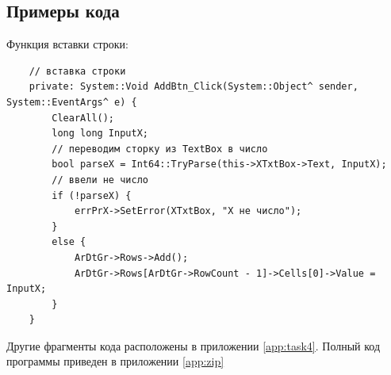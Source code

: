 \subsection{Примеры кода}

Функция вставки строки: 

\begin{verbatim}
	// вставка строки
	private: System::Void AddBtn_Click(System::Object^ sender, System::EventArgs^ e) {
		ClearAll();
		long long InputX;
		// переводим сторку из TextBox в число
		bool parseX = Int64::TryParse(this->XTxtBox->Text, InputX);
		// ввели не число
		if (!parseX) {
			errPrX->SetError(XTxtBox, "X не число");
		}
		else {
			ArDtGr->Rows->Add();
			ArDtGr->Rows[ArDtGr->RowCount - 1]->Cells[0]->Value = InputX;
		}
	}
\end{verbatim}

Другие фрагменты кода расположены в приложении \ref{app:task4}. Полный код программы приведен в приложении \ref{app:zip}
